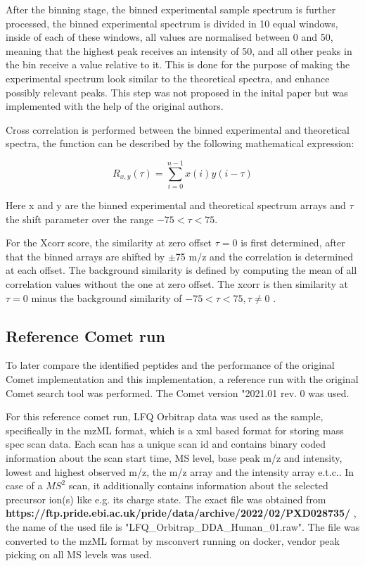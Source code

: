 \documentclass[11pt]{article}
\begin{document}
After the binning stage, the binned experimental sample spectrum is further processed, the binned experimental spectrum is divided in 10 equal windows, inside of each of these windows, all values are normalised between 0 and 50, meaning that the highest peak receives an intensity of 50, and all other peaks in the bin receive a value relative to it. This is done for the purpose of making the experimental spectrum look similar to the theoretical spectra, and enhance possibly relevant peaks. This step was not proposed in the inital paper but was implemented with the help of the original authors.

Cross correlation is performed between the binned experimental and theoretical spectra, the function can be described by the following mathematical expression:

\[R_{x,y}(\tau)=\displaystyle\sum_{i=0}^{n-1}x(i)y(i-\tau)\]

Here x and y are the binned experimental and theoretical spectrum arrays and \(\tau\) the shift parameter over the range \(-75 < \tau < 75\).

For the Xcorr score, the similarity at zero offset \(\tau=0\) is first determined, after that the binned arrays are shifted by $\pm$75 m/z and the correlation is determined at each offset.
The background similarity is defined by computing the mean of all correlation values without the one at zero offset. The xcorr is then similarity at \(\tau=0\) minus the background similarity of \(-75<\tau<75,\tau\neq0\) \cite{xcorr-function}.

\subsection{Reference Comet run}
To later compare the identified peptides and the performance of the original Comet implementation and this implementation, a reference run with the original Comet search tool was performed. The Comet version "2021.01 rev. 0 was used. 

 For this reference comet run, LFQ Orbitrap data was used as the sample, specifically in the mzML format, which is a xml based format for storing mass spec scan data. Each scan has a unique scan id and contains binary coded information about the scan start time, MS level, base peak m/z and intensity, lowest and highest observed m/z, the m/z array and the intensity array e.t.c.. In case of a \(MS^2\) scan, it additionally contains information about the selected precursor ion(s) like e.g. its charge state. The exact file was obtained from \textbf{https://ftp.pride.ebi.ac.uk/pride/data/archive/2022/02/PXD028735/} , the name of the used file is "LFQ\_Orbitrap\_DDA\_Human\_01.raw". The file was converted to the mzML format by msconvert running on docker, vendor peak picking on all MS levels was used.
\end{document}
